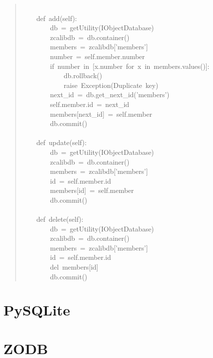 \documentclass[a4paper,openany,twoside,final]{book}
\begin{document}
\begin{quote}
{~\\
~~~~def~add(self):\\
~~~~~~~~db~=~getUtility(IObjectDatabase)\\
~~~~~~~~zcalibdb~=~db.container()\\
~~~~~~~~members~=~zcalibdb{[}'members'{]}\\
~~~~~~~~number~=~self.member.number\\
~~~~~~~~if~number~in~{[}x.number~for~x~in~members.values(){]}:\\
~~~~~~~~~~~~db.rollback()\\
~~~~~~~~~~~~raise~Exception(\textquotedbl{}Duplicate~key\textquotedbl{})\\
~~~~~~~~next\_id~=~db.get\_next\_id('members')\\
~~~~~~~~self.member.id~=~next\_id\\
~~~~~~~~members{[}next\_id{]}~=~self.member\\
~~~~~~~~db.commit()\\
~\\
~~~~def~update(self):\\
~~~~~~~~db~=~getUtility(IObjectDatabase)\\
~~~~~~~~zcalibdb~=~db.container()\\
~~~~~~~~members~=~zcalibdb{[}'members'{]}\\
~~~~~~~~id~=~self.member.id\\
~~~~~~~~members{[}id{]}~=~self.member\\
~~~~~~~~db.commit()\\
~\\
~~~~def~delete(self):\\
~~~~~~~~db~=~getUtility(IObjectDatabase)\\
~~~~~~~~zcalibdb~=~db.container()\\
~~~~~~~~members~=~zcalibdb{[}'members'{]}\\
~~~~~~~~id~=~self.member.id\\
~~~~~~~~del~members{[}id{]}\\
~~~~~~~~db.commit()
}
\end{quote}


\section{PySQLite%
  \label{pysqlite}%
}


\section{ZODB%
  \label{zodb}%
}
\end{document}
